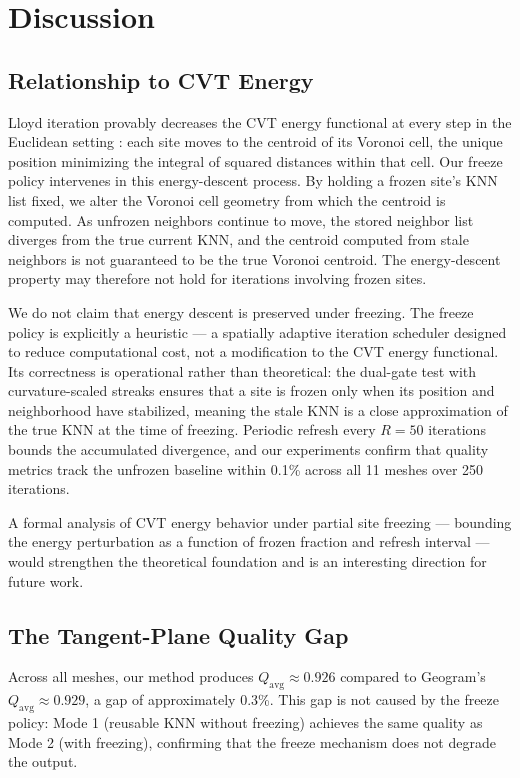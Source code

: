 \section{Discussion}
\label{sec:discussion}

\subsection{Relationship to CVT Energy}

Lloyd iteration provably decreases the CVT energy functional at every step in the Euclidean setting \cite{du1999cvt}: each site moves to the centroid of its Voronoi cell, the unique position minimizing the integral of squared distances within that cell. Our freeze policy intervenes in this energy-descent process. By holding a frozen site's KNN list fixed, we alter the Voronoi cell geometry from which the centroid is computed. As unfrozen neighbors continue to move, the stored neighbor list diverges from the true current KNN, and the centroid computed from stale neighbors is not guaranteed to be the true Voronoi centroid. The energy-descent property may therefore not hold for iterations involving frozen sites.

We do not claim that energy descent is preserved under freezing. The freeze policy is explicitly a heuristic --- a spatially adaptive iteration scheduler designed to reduce computational cost, not a modification to the CVT energy functional. Its correctness is operational rather than theoretical: the dual-gate test with curvature-scaled streaks ensures that a site is frozen only when its position and neighborhood have stabilized, meaning the stale KNN is a close approximation of the true KNN at the time of freezing. Periodic refresh every $R = 50$ iterations bounds the accumulated divergence, and our experiments confirm that quality metrics track the unfrozen baseline within 0.1\% across all 11 meshes over 250 iterations.

A formal analysis of CVT energy behavior under partial site freezing --- bounding the energy perturbation as a function of frozen fraction and refresh interval --- would strengthen the theoretical foundation and is an interesting direction for future work.

\subsection{The Tangent-Plane Quality Gap}

Across all meshes, our method produces $Q_{\mathrm{avg}} \approx 0.926$ compared to Geogram's $Q_{\mathrm{avg}} \approx 0.929$, a gap of approximately 0.3\%. This gap is not caused by the freeze policy: Mode 1 (reusable KNN without freezing) achieves the same quality as Mode 2 (with freezing), confirming that the freeze mechanism does not degrade the output.

